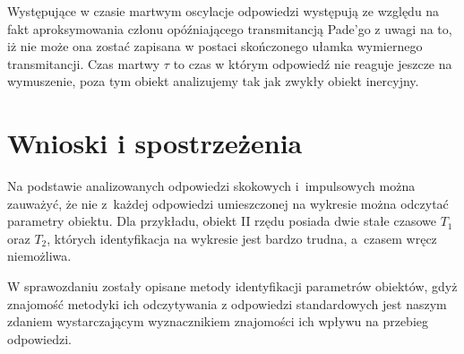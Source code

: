 \documentclass[12pt]{article}
\begin{document}
Występujące w czasie martwym oscylacje odpowiedzi występują ze względu na fakt
aproksymowania członu opóźniającego transmitancją Pade'go z uwagi na to, iż nie
może ona zostać zapisana w postaci skończonego ułamka wymiernego transmitancji.
Czas martwy $\tau$ to czas w którym odpowiedź nie reaguje jeszcze na wymuszenie,
poza tym obiekt analizujemy tak jak zwykły obiekt inercyjny.

\newpage

\section{Wnioski i spostrzeżenia}

Na podstawie analizowanych odpowiedzi skokowych i~impulsowych można zauważyć, że
nie z~każdej odpowiedzi umieszczonej na wykresie można odczytać parametry
obiektu. Dla przykładu, obiekt II rzędu posiada dwie stałe czasowe $T_1$ oraz
$T_2$, których identyfikacja na wykresie jest bardzo trudna, a~czasem wręcz
niemożliwa.

W sprawozdaniu zostały opisane metody identyfikacji parametrów obiektów, gdyż
znajomość metodyki ich odczytywania z odpowiedzi standardowych jest naszym
zdaniem wystarczającym wyznacznikiem znajomości ich wpływu na przebieg
odpowiedzi.
\end{document}

